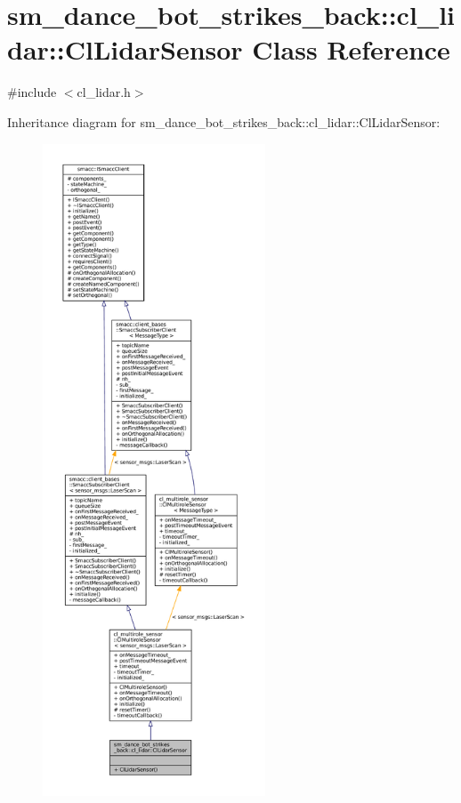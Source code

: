 \hypertarget{classsm__dance__bot__strikes__back_1_1cl__lidar_1_1ClLidarSensor}{}\section{sm\+\_\+dance\+\_\+bot\+\_\+strikes\+\_\+back\+:\+:cl\+\_\+lidar\+:\+:Cl\+Lidar\+Sensor Class Reference}
\label{classsm__dance__bot__strikes__back_1_1cl__lidar_1_1ClLidarSensor}


{\ttfamily \#include $<$cl\+\_\+lidar.\+h$>$}



Inheritance diagram for sm\+\_\+dance\+\_\+bot\+\_\+strikes\+\_\+back\+:\+:cl\+\_\+lidar\+:\+:Cl\+Lidar\+Sensor\+:
\nopagebreak
\begin{figure}[H]
\begin{center}
\leavevmode
\includegraphics[height=550pt]{classsm__dance__bot__strikes__back_1_1cl__lidar_1_1ClLidarSensor__inherit__graph}
\end{center}
\end{figure}


